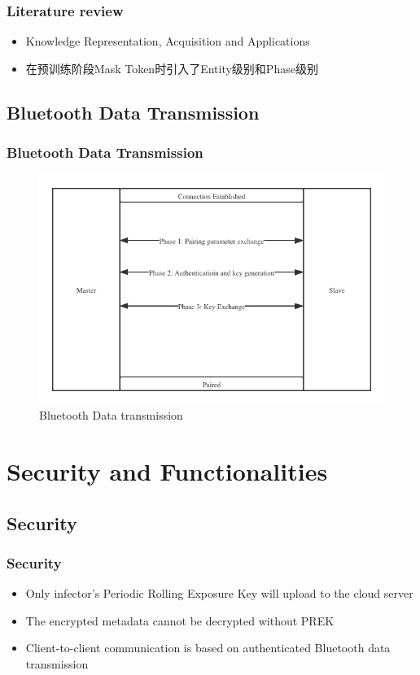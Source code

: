\documentclass{beamer}
\begin{document}
\begin{frame}
  \frametitle{Literature review}
  \begin{itemize}
    \item Knowledge Representation, Acquisition and Applications\cite{1}
    \item 在预训练阶段Mask Token时引入了Entity级别和Phase级别\cite{}
  \end{itemize}

\end{frame}


\subsection{Bluetooth Data Transmission}
\begin{frame}
  \frametitle{Bluetooth Data Transmission}
  \begin{figure}[]
    \centering
    \includegraphics[height=0.6\textwidth]{figure/auble}
    \caption{Bluetooth Data transmission}
  \end{figure}
  

\end{frame}

\section{Security and Functionalities}
\subsection{Security}
\begin{frame}
  \frametitle{Security}
  \begin{itemize}
    \item Only infector’s Periodic Rolling Exposure Key will upload to the cloud server
    \item The encrypted metadata cannot be decrypted without PREK
    \item Client-to-client communication is based on authenticated Bluetooth data transmission
  \end{itemize}

\end{frame}
\end{document}
